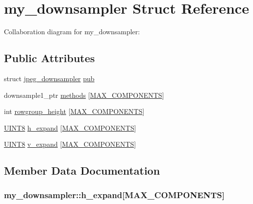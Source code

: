 \hypertarget{structmy__downsampler}{}\section{my\+\_\+downsampler Struct Reference}
\label{structmy__downsampler}


Collaboration diagram for my\+\_\+downsampler\+:
\subsection*{Public Attributes}
\begin{DoxyCompactItemize}
\item 
struct \hyperlink{structjpeg__downsampler}{jpeg\+\_\+downsampler} \hyperlink{structmy__downsampler_a3ace227dd4fd9fdf8e8fe542ca6503c3}{pub}
\item 
downsample1\+\_\+ptr \hyperlink{structmy__downsampler_a6e74bc63d21fbd97d92dc36f65011a75}{methods} \mbox{[}\hyperlink{jmorecfg_8h_a6d8c910a1fdb6d4762a05f7250e64322}{M\+A\+X\+\_\+\+C\+O\+M\+P\+O\+N\+E\+N\+T\+S}\mbox{]}
\item 
int \hyperlink{structmy__downsampler_a60c30dd6034e706ee9d21d0f5f198af7}{rowgroup\+\_\+height} \mbox{[}\hyperlink{jmorecfg_8h_a6d8c910a1fdb6d4762a05f7250e64322}{M\+A\+X\+\_\+\+C\+O\+M\+P\+O\+N\+E\+N\+T\+S}\mbox{]}
\item 
\hyperlink{jmorecfg_8h_adfb9a8ea1dd59f151065f763e1e9acd6}{U\+I\+N\+T8} \hyperlink{structmy__downsampler_a051e236dc44201165b1625621994b86c}{h\+\_\+expand} \mbox{[}\hyperlink{jmorecfg_8h_a6d8c910a1fdb6d4762a05f7250e64322}{M\+A\+X\+\_\+\+C\+O\+M\+P\+O\+N\+E\+N\+T\+S}\mbox{]}
\item 
\hyperlink{jmorecfg_8h_adfb9a8ea1dd59f151065f763e1e9acd6}{U\+I\+N\+T8} \hyperlink{structmy__downsampler_ab3bc55e23e197c2129ae09c82fb62e83}{v\+\_\+expand} \mbox{[}\hyperlink{jmorecfg_8h_a6d8c910a1fdb6d4762a05f7250e64322}{M\+A\+X\+\_\+\+C\+O\+M\+P\+O\+N\+E\+N\+T\+S}\mbox{]}
\end{DoxyCompactItemize}


\subsection{Member Data Documentation}
\hypertarget{structmy__downsampler_a051e236dc44201165b1625621994b86c}{}
\subsubsection[{h\+\_\+expand}]{ my\+\_\+downsampler\+::h\+\_\+expand\mbox{[}{\bf M\+A\+X\+\_\+\+C\+O\+M\+P\+O\+N\+E\+N\+T\+S}\mbox{]}}\label{structmy__downsampler_a051e236dc44201165b1625621994b86c}
\hypertarget{structmy__downsampler_a6e74bc63d21fbd97d92dc36f65011a75}{}
